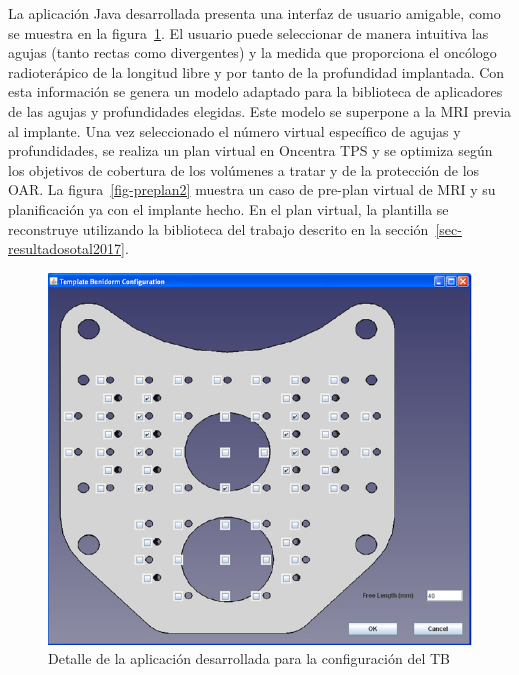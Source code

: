 \documentclass[
  a4paper,
]{scrreprt}
\begin{document}
La aplicación Java desarrollada presenta una interfaz de usuario
amigable, como se muestra en la figura~\ref{fig-preplan1}. El usuario
puede seleccionar de manera intuitiva las agujas (tanto rectas como
divergentes) y la medida que proporciona el oncólogo radioterápico de la
longitud libre y por tanto de la profundidad implantada. Con esta
información se genera un modelo adaptado para la biblioteca de
aplicadores de las agujas y profundidades elegidas. Este modelo se
superpone a la MRI previa al implante. Una vez seleccionado el número
virtual específico de agujas y profundidades, se realiza un plan virtual
en Oncentra TPS y se optimiza según los objetivos de cobertura de los
volúmenes a tratar y de la protección de los OAR. La
figura~\ref{fig-preplan2} muestra un caso de pre-plan virtual de MRI y
su planificación ya con el implante hecho. En el plan virtual, la
plantilla se reconstruye utilizando la biblioteca del trabajo descrito
en la sección~\ref{sec-resultadosotal2017}.

\begin{figure}

{\centering \includegraphics{img/Preplan1.png}

}

\caption{\label{fig-preplan1}Detalle de la aplicación desarrollada para
la configuración del TB}

\end{figure}
\end{document}
